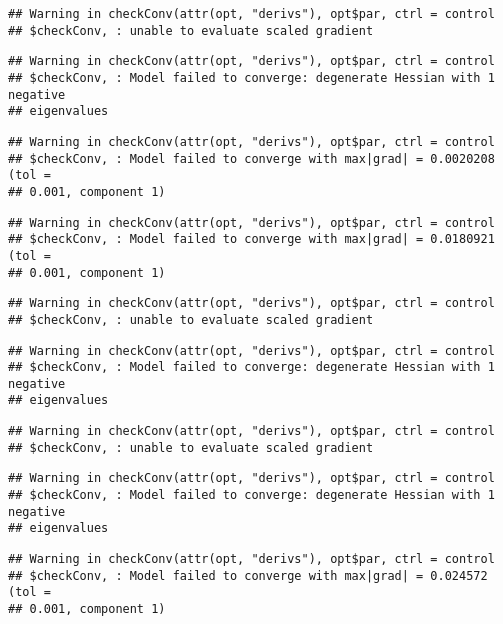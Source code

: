 \documentclass[]{article}
\begin{document}
\begin{verbatim}
## Warning in checkConv(attr(opt, "derivs"), opt$par, ctrl = control
## $checkConv, : unable to evaluate scaled gradient
\end{verbatim}

\begin{verbatim}
## Warning in checkConv(attr(opt, "derivs"), opt$par, ctrl = control
## $checkConv, : Model failed to converge: degenerate Hessian with 1 negative
## eigenvalues
\end{verbatim}

\begin{verbatim}
## Warning in checkConv(attr(opt, "derivs"), opt$par, ctrl = control
## $checkConv, : Model failed to converge with max|grad| = 0.0020208 (tol =
## 0.001, component 1)
\end{verbatim}

\begin{verbatim}
## Warning in checkConv(attr(opt, "derivs"), opt$par, ctrl = control
## $checkConv, : Model failed to converge with max|grad| = 0.0180921 (tol =
## 0.001, component 1)
\end{verbatim}

\begin{verbatim}
## Warning in checkConv(attr(opt, "derivs"), opt$par, ctrl = control
## $checkConv, : unable to evaluate scaled gradient
\end{verbatim}

\begin{verbatim}
## Warning in checkConv(attr(opt, "derivs"), opt$par, ctrl = control
## $checkConv, : Model failed to converge: degenerate Hessian with 1 negative
## eigenvalues
\end{verbatim}

\begin{verbatim}
## Warning in checkConv(attr(opt, "derivs"), opt$par, ctrl = control
## $checkConv, : unable to evaluate scaled gradient
\end{verbatim}

\begin{verbatim}
## Warning in checkConv(attr(opt, "derivs"), opt$par, ctrl = control
## $checkConv, : Model failed to converge: degenerate Hessian with 1 negative
## eigenvalues
\end{verbatim}

\begin{verbatim}
## Warning in checkConv(attr(opt, "derivs"), opt$par, ctrl = control
## $checkConv, : Model failed to converge with max|grad| = 0.024572 (tol =
## 0.001, component 1)
\end{verbatim}
\end{document}
